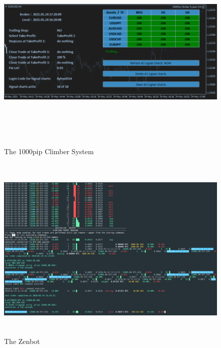 \documentclass[12pt,a4paper]{report}
\begin{document}
\newpage
\begin{figure}[!htbp]
	\centering
	\includegraphics[width=16cm,height=9cm]{pics/1000PipClimberSystemEA.png}
	\caption{The 1000pip Climber System\protect\footnotemark}
	\label{fig:pip}
	\bigskip
	\includegraphics[width=16cm,height=9cm]{pics/zenbot.png}
	\caption{The Zenbot\protect\footnotemark[5]}
	\label{fig:zenbot}
\end{figure}
\newpage
\end{document}
